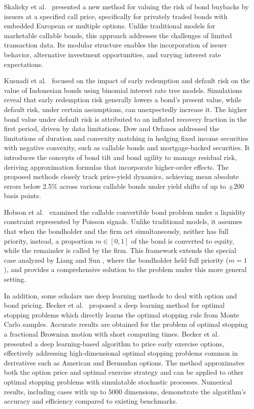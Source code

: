\documentclass[reqno]{amsart}
\begin{document}
Skalicky et al.\ \cite{skalicky2022valuation} presented a new method for valuing the 
risk of bond buybacks by issuers at a specified call price, specifically for privately 
traded bonds with embedded European or multiple options. Unlike traditional models 
for marketable callable bonds, this approach addresses the challenges of limited 
transaction data. Its modular structure enables the incorporation of issuer behavior, 
alternative investment opportunities, and varying interest rate expectations.

 Kusnadi et al.\ \cite{kusnadi2023callable} focused on the impact of early redemption
and default risk on the value of Indonesian bonds using binomial interest rate tree 
models. Simulations reveal that early redemption risk generally lowers a bond's present
value, while default risk, under certain assumptions, can unexpectedly increase it. 
The higher bond value under default risk is attributed to an inflated recovery 
fraction in the first period, driven by data limitations.
Dow and Orfanos \cite{dow2025interest} addressed the limitations of duration and 
convexity matching in hedging fixed income securities with negative convexity, 
such as callable bonds and mortgage-backed securities. It introduces the concepts of 
bond tilt and bond agility to manage residual risk, deriving approximation formulas 
that incorporate higher-order effects. The proposed methods closely track price-yield 
dynamics, achieving mean absolute errors below 2.5$\%$ across various callable bonds 
under yield shifts of up to $\pm 200$ basis points.


 Hobson et al.\ \cite{hobson2024callable} examined the callable convertible bond 
problem under a liquidity constraint represented by Poisson signals. Unlike traditional 
models, it assumes that when the bondholder and the firm act simultaneously, neither 
has full priority, instead, a proportion $ m \in [0, 1] $ of the bond is converted to 
equity, while the remainder is called by the firm. This framework extends the special 
case analyzed by Liang and Sun \cite{liang2019dynkin}, where the bondholder held full 
priority ($ m = 1 $), and provides a comprehensive solution to the problem under 
this more general setting.

In addition, some scholars use deep learning methods to deal with option and bond 
pricing.
Becker et al.\ \cite{becker2019deep} proposed a deep learning method for optimal 
stopping problems which directly learns the optimal stopping rule from Monte Carlo 
samples.
 Accurate results are obtained for the problem of optimal stopping
a fractional Brownian motion with short computing times.
Becker et al.\ \cite{becker2021solving} presented a deep learning-based algorithm 
to price early exercise options, effectively addressing high-dimensional optimal 
stopping problems common in derivatives such as American and Bermudan options. 
The method approximates both the option price and optimal exercise strategy and can be 
applied to other optimal stopping problems with simulatable stochastic processes. 
Numerical results, including cases with up to 5000 dimensions, demonstrate the 
algorithm's accuracy and efficiency compared to existing benchmarks.
\end{document}
